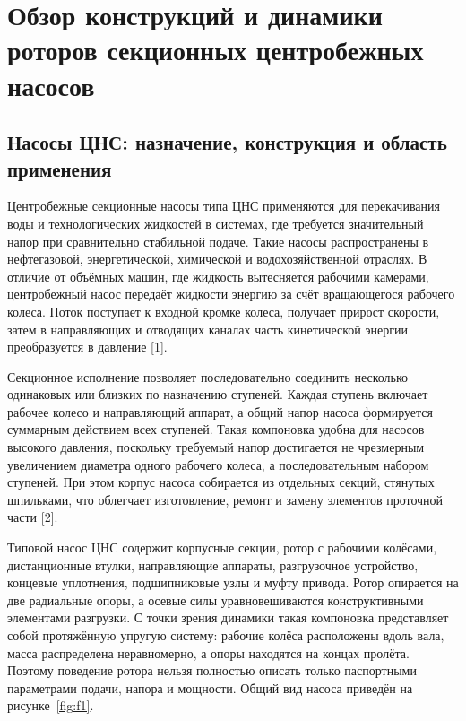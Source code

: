 \section{Обзор конструкций и динамики роторов секционных центробежных насосов}

\subsection{Насосы ЦНС: назначение, конструкция и область применения}

Центробежные секционные насосы типа ЦНС применяются для перекачивания воды и технологических жидкостей в системах, где требуется значительный напор при сравнительно стабильной подаче. Такие насосы распространены в нефтегазовой, энергетической, химической и водохозяйственной отраслях. В отличие от объёмных машин, где жидкость вытесняется рабочими камерами, центробежный насос передаёт жидкости энергию за счёт вращающегося рабочего колеса. Поток поступает к входной кромке колеса, получает прирост скорости, затем в направляющих и отводящих каналах часть кинетической энергии преобразуется в давление [1].

Секционное исполнение позволяет последовательно соединить несколько одинаковых или близких по назначению ступеней. Каждая ступень включает рабочее колесо и направляющий аппарат, а общий напор насоса формируется суммарным действием всех ступеней. Такая компоновка удобна для насосов высокого давления, поскольку требуемый напор достигается не чрезмерным увеличением диаметра одного рабочего колеса, а последовательным набором ступеней. При этом корпус насоса собирается из отдельных секций, стянутых шпильками, что облегчает изготовление, ремонт и замену элементов проточной части [2].

Типовой насос ЦНС содержит корпусные секции, ротор с рабочими колёсами, дистанционные втулки, направляющие аппараты, разгрузочное устройство, концевые уплотнения, подшипниковые узлы и муфту привода. Ротор опирается на две радиальные опоры, а осевые силы уравновешиваются конструктивными элементами разгрузки. С точки зрения динамики такая компоновка представляет собой протяжённую упругую систему: рабочие колёса расположены вдоль вала, масса распределена неравномерно, а опоры находятся на концах пролёта. Поэтому поведение ротора нельзя полностью описать только паспортными параметрами подачи, напора и мощности. Общий вид насоса приведён на рисунке~\ref{fig:f1}.


